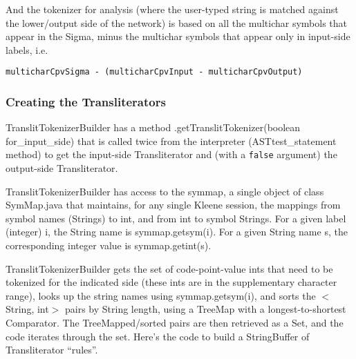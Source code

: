 \documentclass[letterpaper,12pt]{article}
\begin{document}
\noindent
And the tokenizer for analysis (where the user-typed string is matched
against the lower/output side of the network) is based on all the multichar
symbols that appear in the Sigma, minus the multichar symbols that appear
only in input-side labels, i.e.

\begin{Verbatim}[fontsize=\small]
multicharCpvSigma - (multicharCpvInput - multicharCpvOutput)
\end{Verbatim}

\subsubsection{Creating the Transliterators}

TranslitTokenizerBuilder has a method .getTranslitTokenizer(boolean
for\_input\_side) that is called twice from the interpreter (ASTtest\_statement
	method) to get the input-side Transliterator and (with a
	\texttt{false} argument) the output-side Transliterator.  

TranslitTokenizerBuilder has access to the symmap, a single object of class
SymMap.java that maintains, for any single Kleene session, the mappings
from symbol names (Strings) to int, and from int to symbol Strings.  For a
given label (integer) i, the String name is symmap.getsym(i).  For a given
String name s, the corresponding integer value is symmap.getint(s).

TranslitTokenizerBuilder gets the set of code-point-value ints that need to
be tokenized for the indicated side (these ints are in the supplementary
character range), looks up the string names using symmap.getsym(i), and
sorts the $<$String, int$>$ pairs by String length, using a TreeMap with a longest-to-shortest
Comparator.  The TreeMapped/sorted pairs are then retrieved as a Set, and
the code iterates through the set.  Here's the code to build a StringBuffer
of Transliterator ``rules''.
\end{document}
